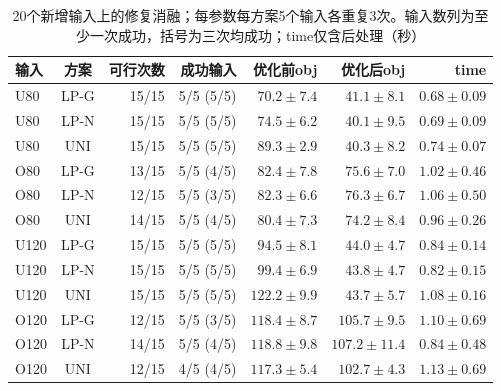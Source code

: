 \begin{table}[htbp]
\centering\footnotesize
\caption{20个新增输入上的修复消融；每参数每方案5个输入各重复3次。输入数列为至少一次成功，括号为三次均成功；time仅含后处理（秒）}\label{tab:extra-results}
\begin{tabular}{lcrrrrr}\toprule
输入 & 方案 & 可行次数 & 成功输入 & 优化前obj & 优化后obj & time \\\midrule
U80 & LP-G & 15/15 & 5/5 (5/5) & $70.2\pm7.4$ & $41.1\pm8.1$ & $0.68\pm0.09$ \\
U80 & LP-N & 15/15 & 5/5 (5/5) & $74.5\pm6.2$ & $40.1\pm9.5$ & $0.69\pm0.09$ \\
U80 & UNI & 15/15 & 5/5 (5/5) & $89.3\pm2.9$ & $40.3\pm8.2$ & $0.74\pm0.07$ \\
O80 & LP-G & 13/15 & 5/5 (4/5) & $82.4\pm7.8$ & $75.6\pm7.0$ & $1.02\pm0.46$ \\
O80 & LP-N & 12/15 & 5/5 (3/5) & $82.3\pm6.6$ & $76.3\pm6.7$ & $1.06\pm0.50$ \\
O80 & UNI & 14/15 & 5/5 (4/5) & $80.4\pm7.3$ & $74.2\pm8.4$ & $0.96\pm0.26$ \\
U120 & LP-G & 15/15 & 5/5 (5/5) & $94.5\pm8.1$ & $44.0\pm4.7$ & $0.84\pm0.14$ \\
U120 & LP-N & 15/15 & 5/5 (5/5) & $99.4\pm6.9$ & $43.8\pm4.7$ & $0.82\pm0.15$ \\
U120 & UNI & 15/15 & 5/5 (5/5) & $122.2\pm9.9$ & $43.7\pm5.7$ & $1.08\pm0.16$ \\
O120 & LP-G & 12/15 & 5/5 (3/5) & $118.4\pm8.7$ & $105.7\pm9.5$ & $1.10\pm0.69$ \\
O120 & LP-N & 14/15 & 5/5 (4/5) & $118.8\pm9.8$ & $107.2\pm11.4$ & $0.84\pm0.48$ \\
O120 & UNI & 12/15 & 4/5 (4/5) & $117.3\pm5.4$ & $102.7\pm4.3$ & $1.13\pm0.69$ \\
\bottomrule\end{tabular}
\end{table}
